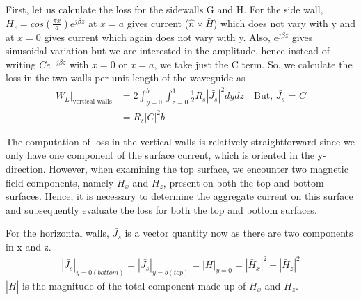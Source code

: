 First, let us calculate the loss for the sidewalls G and H. For the side wall, $H_z=cos(\frac{\pi x}{a})e^{j\beta z}$ at $x=a$ gives current ($\hat{n} \times \bar{H}$) which does not vary with y and at $x=0$ gives current which again does not vary with y. Also, $e^{j\beta z}$ gives sinusoidal variation but we are interested in the amplitude, hence instead of writing $Ce^{-j\beta z}$ with $x=0$ or $x=a$, we take just the C term. So, we calculate the loss in the two walls per unit length of the waveguide as
\begin{align*}
W_L|_{\text{vertical walls}} &= 2\int_{y=0}^{b}\int_{z=0}^{1}\frac{1}{2}R_s|\bar{J_s}|^2dydz\quad\text{But, }\bar{J_s}\text{ = }C\\
&= R_s|C|^2b
\end{align*}

The computation of loss in the vertical walls is relatively straightforward since we only have one component of the surface current, which is oriented in the y-direction. However, when examining the top surface, we encounter two magnetic field components, namely $H_x$ and $H_z$, present on both the top and bottom surfaces. Hence, it is necessary to determine the aggregate current on this surface and subsequently evaluate the loss for both the top and bottom surfaces. 

For the horizontal walls, $\bar{J_s}$ is a vector quantity now as there are two components in x and z.
\begin{align*}
|\bar{J_s}|_{y=0(bottom)} = |\bar{J_s}|_{y=b(top)} = |H|_{y=0} = |\bar{H}_x|^2 + |\bar{H}_z|^2
\end{align*}
$|\bar{H}|$ is the magnitude of the total component made up of $H_x$ and $H_z$.

